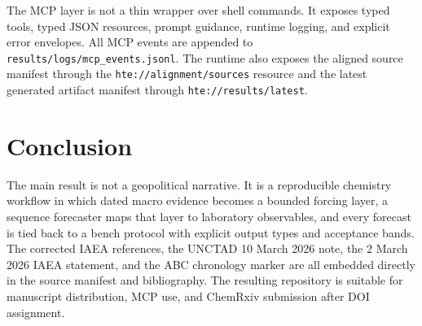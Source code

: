 \documentclass[11pt]{article}
\begin{document}
The MCP layer is not a thin wrapper over shell commands. It exposes typed tools, typed JSON resources, prompt guidance, runtime logging, and explicit error envelopes. All MCP events are appended to \texttt{results/logs/mcp\_events.jsonl}. The runtime also exposes the aligned source manifest through the \texttt{hte://alignment/sources} resource and the latest generated artifact manifest through \texttt{hte://results/latest}.

\section{Conclusion}

The main result is not a geopolitical narrative. It is a reproducible chemistry workflow in which dated macro evidence becomes a bounded forcing layer, a sequence forecaster maps that layer to laboratory observables, and every forecast is tied back to a bench protocol with explicit output types and acceptance bands. The corrected IAEA references, the UNCTAD 10 March 2026 note, the 2 March 2026 IAEA statement, and the ABC chronology marker are all embedded directly in the source manifest and bibliography. The resulting repository is suitable for manuscript distribution, MCP use, and ChemRxiv submission after DOI assignment.
\end{document}
